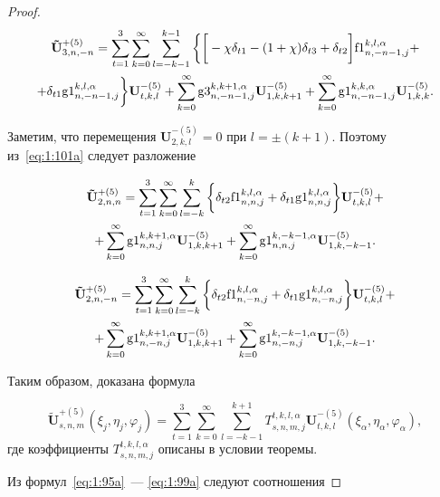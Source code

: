 \begin{russian}
\begin{proof}
\begin{multline}
\mathbf{\tilde U}_{3,n,-n}^{+(5)}=\sum\limits_{t=1}^3\sum\limits_{k=0}^\infty\sum\limits_{l=-k-1}^{k-1}\bigg\{\bigg\lbrack-\chi\delta_{t1}-(1+\chi)\delta_{t3}+\delta_{t2}\bigg\rbrack{\rm f1}_{n,-n-1,j}^{k,l,\alpha}+ \\
+\delta_{t1}{\rm g1}_{n,-n-1,j}^{k,l,\alpha}\bigg\}\mathbf{U}_{t,k,l}^{-(5)}+\sum\limits_{k=0}^\infty{\rm g3}_{n,-n-1,j}^{k,k+1,\alpha}\mathbf{U}_{1,k,k+1}^{-(5)}+\sum\limits_{k=0}^\infty{\rm g1}_{n,-n-1,j}^{k,k,\alpha}\mathbf{U}_{1,k,k}^{-(5)}.
\label{eq:1:111p}
\end{multline}

Заметим, что перемещения $\mathbf{U}_{2,k,l}^{-(5)}=0$ при $l=\pm(k+1)$. Поэтому из~\eqref{eq:1:101a} следует разложение

\begin{multline}
\mathbf{\tilde U}_{2,n,n}^{+(5)}=\sum\limits_{t=1}^3\sum\limits_{k=0}^\infty\sum\limits_{l=-k}^{k}\bigg\{\delta_{t2}{\rm f1}_{n,n,j}^{k,l,\alpha}+\delta_{t1}{\rm g1}_{n,n,j}^{k,l,\alpha}\bigg\}\mathbf{U}_{t,k,l}^{-(5)}+ \\
+\sum\limits_{k=0}^\infty{\rm g1}_{n,n,j}^{k,k+1,\alpha}\mathbf{U}_{1,k,k+1}^{-(5)}+\sum\limits_{k=0}^\infty{\rm g1}_{n,n,j}^{k,-k-1,\alpha}\mathbf{U}_{1,k,-k-1}^{-(5)}.
\label{eq:1:112p}
\end{multline}

\begin{multline}
\mathbf{\tilde U}_{2,n,-n}^{+(5)}=\sum\limits_{t=1}^3\sum\limits_{k=0}^\infty\sum\limits_{l=-k}^{k}\bigg\{\delta_{t2}{\rm f1}_{n,-n,j}^{k,l,\alpha}+\delta_{t1}{\rm g1}_{n,-n,j}^{k,l,\alpha}\bigg\}\mathbf{U}_{t,k,l}^{-(5)}+ \\
+\sum\limits_{k=0}^\infty{\rm g1}_{n,-n,j}^{k,k+1,\alpha}\mathbf{U}_{1,k,k+1}^{-(5)}+\sum\limits_{k=0}^\infty{\rm g1}_{n,-n,j}^{k,-k-1,\alpha}\mathbf{U}_{1,k,-k-1}^{-(5)}.
\label{eq:1:113p}
\end{multline}

Таким образом, доказана формула

\begin{equation}
\mathbf{\tilde U}_{s,n,m}^{+(5)}(\xi_j,\eta_j,\varphi_j)=\sum\limits_{t=1}^3\sum\limits_{k=0}^\infty\sum\limits_{l=-k-1}^{k+1}T_{s,n,m,j}^{t,k,l,\alpha}\mathbf{U}_{t,k,l}^{-(5)}(\xi_\alpha,\eta_\alpha,\varphi_\alpha),
\label{eq:1:114p}
\end{equation}
где коэффициенты $T_{s,n,m,j}^{t,k,l,\alpha}$ описаны в условии теоремы.

Из формул~\eqref{eq:1:95a}~--- \eqref{eq:1:99a} следуют соотношения


\end{proof}
\end{russian}
